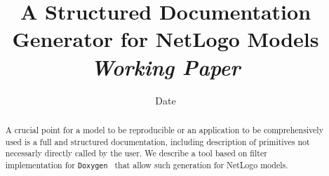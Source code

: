 


\title{A Structured Documentation Generator for NetLogo Models\bigskip\\
\textit{Working Paper}
}
\author{}
\date{Date}


\maketitle

\begin{abstract}
A crucial point for a model to be reproducible or an application to be comprehensively used is a full and structured documentation, including description of primitives not necessarly directly called by the user. We describe a tool based on filter implementation for \texttt{Doxygen}~\cite{} that allow such generation for NetLogo models.
\end{abstract}






















